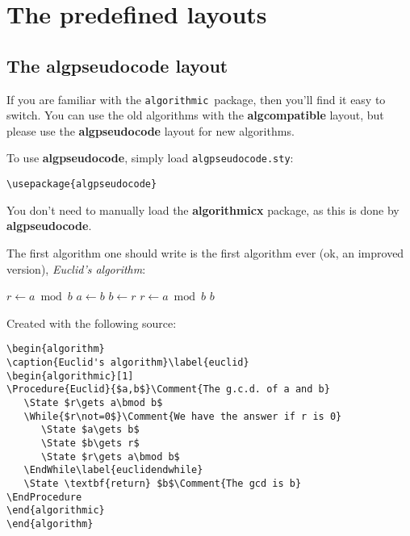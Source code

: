 \documentclass{article}
\newcommand{\old}{\texttt{algorithmic}}
\newcommand{\euk}{Euclid}
\begin{document}
\section{The predefined layouts}

\subsection{The \textbf{algpseudocode} layout}\label{algpseudocode}
If you are familiar with the \old\ package, then you'll find it easy to 
switch. You can use the old algorithms with the \textbf{algcompatible} layout, but please
use the \textbf{algpseudocode} layout for new algorithms.

To use \textbf{algpseudocode}, simply load \verb:algpseudocode.sty::

\begin{verbatim}
\usepackage{algpseudocode}
\end{verbatim}

You don't need to manually load the \textbf{algorithmicx} package, as this is done by
\textbf{algpseudocode}.

The first algorithm one should write is the first algorithm ever (ok, 
an improved version), \textit{\euk's algorithm}:

\begin{algorithm}[H]
\caption{\euk's algorithm}\label{euclid}
\begin{algorithmic}[1]
\Procedure{\euk}{$a,b$}
   \State $r\gets a\bmod b$
      \State $a\gets b$
      \State $b\gets r$
      \State $r\gets a\bmod b$
   \EndWhile\label{euclidendwhile}
   \State \Return $b$
\EndProcedure
\end{algorithmic}
\end{algorithm}


Created with the following source:
\begin{verbatim}
\begin{algorithm}
\caption{Euclid's algorithm}\label{euclid}
\begin{algorithmic}[1]
\Procedure{Euclid}{$a,b$}\Comment{The g.c.d. of a and b}
   \State $r\gets a\bmod b$
   \While{$r\not=0$}\Comment{We have the answer if r is 0}
      \State $a\gets b$
      \State $b\gets r$
      \State $r\gets a\bmod b$
   \EndWhile\label{euclidendwhile}
   \State \textbf{return} $b$\Comment{The gcd is b}
\EndProcedure
\end{algorithmic}
\end{algorithm}
\end{verbatim}
\end{document}
